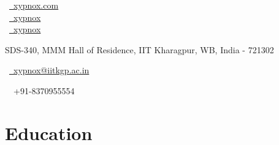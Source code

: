 \documentclass[a4paper,12pt]{extarticle} %
\begin{document}
\pagestyle{empty} %


\begin{multicols}{3}
\normalsize  \faGlobe\ {\href{http://xypnox.com/}{\  xypnox.com}}\\
\normalsize \faGithub\ {\href{https://github.com/xypnox}{\  xypnox}}\\
\normalsize  \faTwitter\ {\href{https://twitter.com/xypnox}{\  xypnox}}\\
\columnbreak
\normalsize\par{} %
\vspace{-0.1cm}
\par{\centering\normalsize {SDS-340, MMM Hall of Residence, IIT Kharagpur, WB, India - 721302}\hfill\par}
\columnbreak
\raggedright\hfill\normalsize \faEnvelope\ {\href{mailto:xypnox@iitkgp.ac.in}{\  xypnox@iitkgp.ac.in}}\\
\raggedright\hfill{\faPhone\ \  +91-8370955554}
\end{multicols}

\vspace{-0.5cm}



\section{\textcolor{primary}{Education}}
\end{document}
